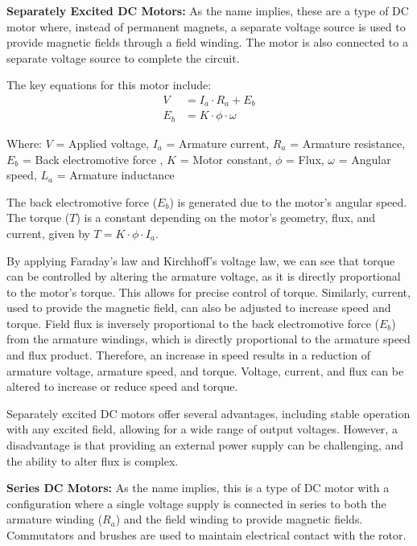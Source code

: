 \documentclass{article}
\begin{document}
\begin{flushleft}
\textbf{Separately Excited DC Motors:} As the name implies, these are a type of DC motor where, instead of permanent magnets, a separate voltage source is used to provide magnetic fields through a field winding. The motor is also connected to a separate voltage source to complete the circuit.

The key equations for this motor include:
\begin{align*}
V &= I_a \cdot R_a + E_b \\
E_b &= K \cdot \phi \cdot \omega
\end{align*}

Where:
$V$ = Applied voltage,
$I_a$ = Armature current,
$R_a$ = Armature resistance,
$E_b$ = Back electromotive force ,
$K$ = Motor constant,
$\phi$ = Flux,
$\omega$ = Angular speed,
$L_a$ = Armature inductance
\newline
\vspace*{3pt}

The back electromotive force ($E_b$) is generated due to the motor's angular speed. The torque ($T$) is a constant depending on the motor's geometry, flux, and current, given by $T = K \cdot \phi \cdot I_a$. 

By applying Faraday's law and Kirchhoff's voltage law, we can see that torque can be controlled by altering the armature voltage, as it is directly proportional to the motor's torque. This allows for precise control of torque. Similarly, current, used to provide the magnetic field, can also be adjusted to increase speed and torque.
\newline
Field flux is inversely proportional to the back electromotive force ($E_b$) from the armature windings, which is directly proportional to the armature speed and flux product. Therefore, an increase in speed results in a reduction of armature voltage, armature speed, and torque. Voltage, current, and flux can be altered to increase or reduce speed and torque.
\newline

Separately excited DC motors offer several advantages, including stable operation with any excited field, allowing for a wide range of output voltages. However, a disadvantage is that providing an external power supply can be challenging, and the ability to alter flux is complex.
\vspace*{5pt}

\textbf{Series DC Motors:} As the name implies, this is a type of DC motor with a configuration where a single voltage supply is connected in series to both the armature winding ($R_a$) and the field winding to provide magnetic fields. Commutators and brushes are used to maintain electrical contact with the rotor.


\end{flushleft}
\end{document}

